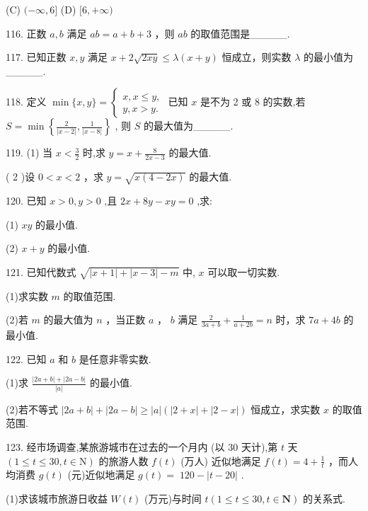 \documentclass[10pt]{article}
\begin{document}
(C) \(( - \infty ,6\rbrack\) (D) \(\lbrack 6, + \infty )\)

116. 正数 \(a,b\) 满足 \({ab} = a + b + 3\) ，则 \({ab}\) 的取值范围是\_\_\_\_\_.

117. 已知正数 \(x,y\) 满足 \(x + 2\sqrt{2xy} \leq  \lambda \left( {x + y}\right)\) 恒成立，则实数 \(\lambda\) 的最小值为\_\_\_\_\_.

118. 定义 \(\min \{ x,y\}  = \left\{  \begin{array}{l} x,x \leq  y, \\  y,x > y. \end{array}\right.\) 已知 \(x\) 是不为 2 或 8 的实数,若 \(S = \min \left\{  {\frac{2}{\left| x - 2\right| },\frac{1}{\left| x - 8\right| }}\right\}\) , 则 \(S\) 的最大值为\_\_\_\_\_.

119. (1) 当 \(x < \frac{3}{2}\) 时,求 \(y = x + \frac{8}{{2x} - 3}\) 的最大值.

( 2 )设 \(0 < x < 2\) ，求 \(y = \sqrt{x\left( {4 - {2x}}\right) }\) 的最大值.

120. 已知 \(x > 0,y > 0\) ,且 \({2x} + {8y} - {xy} = 0\) ,求:

(1) \({xy}\) 的最小值.

(2) \(x + y\) 的最小值.

121. 已知代数式 \(\sqrt{\left| {x + 1}\right|  + \left| {x - 3}\right|  - m}\) 中, \(x\) 可以取一切实数.

(1)求实数 \(m\) 的取值范围.

(2)若 \(m\) 的最大值为 \(n\) ，当正数 \(a\) ， \(b\) 满足 \(\frac{2}{{3a} + b} + \frac{1}{a + {2b}} = n\) 时，求 \({7a} + {4b}\) 的最小值.

122. 已知 \(a\) 和 \(b\) 是任意非零实数.

(1)求 \(\frac{\left| {{2a} + b}\right|  + \left| {{2a} - b}\right| }{\left| a\right| }\) 的最小值.

(2)若不等式 \(\left| {{2a} + b}\right|  + \left| {{2a} - b}\right|  \geq  \left| a\right| \left( {\left| {2 + x}\right|  + \left| {2 - x}\right| }\right)\) 恒成立，求实数 \(x\) 的取值范围.

123. 经市场调查,某旅游城市在过去的一个月内 (以 30 天计),第 \(t\) 天 \(\left( {1 \leq  t \leq  {30},t \in  \mathrm{N}}\right)\) 的旅游人数 \(f\left( t\right)\) (万人) 近似地满足 \(f\left( t\right)  = 4 + \frac{1}{t}\) ，而人均消费 \(g\left( t\right)\) (元)近似地满足 \(g\left( t\right)  = \; {120} - \left| {t - {20}}\right|\) .

(1)求该城市旅游日收益 \(W\left( t\right)\) (万元)与时间 \(t\left( {1 \leq  t \leq  {30},t \in  \mathbf{N}}\right)\) 的关系式.
\end{document}
